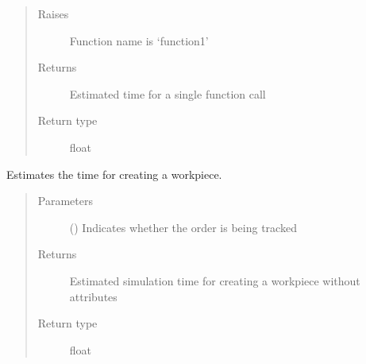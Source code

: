 \documentclass[letterpaper,10pt,english]{sphinxmanual}
\begin{document}
\begin{fulllineitems}
\begin{fulllineitems}
\begin{quote}
\begin{description}
\begin{itemize}
\end{itemize}

\item[{Raises}] \leavevmode
\sphinxAtStartPar
{} \textendash{} Function name is ‘function1’

\item[{Returns}] \leavevmode
\sphinxAtStartPar
Estimated time for a single function call

\item[{Return type}] \leavevmode
\sphinxAtStartPar
float

\end{description}\end{quote}

\end{fulllineitems}


\begin{fulllineitems}
\label{\detokenize{source/API/api:estimator.Estimator.est_item}}
\sphinxAtStartPar
Estimates the time for creating a workpiece.
\begin{quote}\begin{description}
\item[{Parameters}] \leavevmode
\sphinxAtStartPar
{} () \textendash{} Indicates whether the order is being tracked

\item[{Returns}] \leavevmode
\sphinxAtStartPar
Estimated simulation time for creating a workpiece without attributes

\item[{Return type}] \leavevmode
\sphinxAtStartPar
float

\end{description}\end{quote}

\end{fulllineitems}



\end{fulllineitems}
\end{document}
